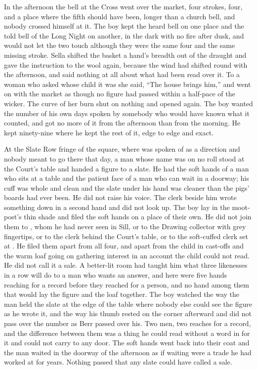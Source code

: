 \scenebreak

In the afternoon the bell at the Cross went over the market, four strokes, four, and a place where the fifth should have been, longer than a church bell, and nobody crossed himself at it. The boy kept the heard bell on one place and the told bell of the Long Night on another, in the dark with no fire after dusk, and would not let the two touch although they were the same four and the same missing stroke. Sella shifted the basket a hand's breadth out of the draught and gave the instruction to the wool again, because the wind had shifted round with the afternoon, and said nothing at all about what had been read over it. To a woman who asked whose child it was she said, “The house brings him,” and went on with the market as though no figure had passed within a half-pace of the wicker. The curve of her burn shut on nothing and opened again. The boy wanted the number of his own days spoken by somebody who would have known what it counted, and got no more of it from the afternoon than from the morning. He kept ninety-nine where he kept the rest of it, edge to edge and exact.

At the Slate Row fringe of the square, where  was spoken of as a direction and nobody meant to go there that day, a man whose name was on no roll stood at the Court's table and handed a figure to a slate. He had the soft hands of a man who sits at a table and the patient face of a man who can wait in a doorway; his cuff was whole and clean and the slate under his hand was cleaner than the pigs' boards had ever been. He did not raise his voice. The clerk beside him wrote something down in a second hand and did not look up. The boy lay in the moot-post's thin shade and filed the soft hands on a place of their own. He did not join them to , whom he had never seen in Sill, or to the Drawing collector with grey fingertips, or to the clerk behind the Court's table, or to the soft-cuffed clerk set at . He filed them apart from all four, and apart from the child in cast-offs and the warm loaf going on gathering interest in an account the child could not read. He did not call it a sale. A better-lit room had taught him what three likenesses in a row will do to a man who wants an answer, and here were five hands reaching for a record before they reached for a person, and no hand among them that would lay the figure and the loaf together. The boy watched the way the man held the slate at the edge of the table where nobody else could see the figure as he wrote it, and the way his thumb rested on the corner afterward and did not pass over the number as Berr passed over his. Two men, two reaches for a record, and the difference between them was a thing he could read without a word in  for it and could not carry to any door. The soft hands went back into their coat and the man waited in the doorway of the afternoon as if waiting were a trade he had worked at for years. Nothing passed that any slate could have called a sale.

